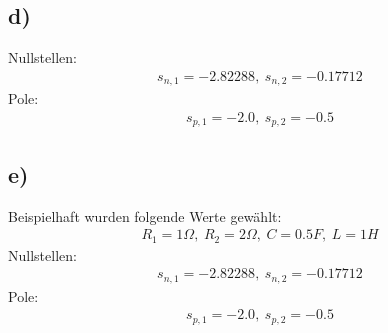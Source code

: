 \documentclass[11pt]{scrartcl} %
\begin{document}
\subsection*{d)}
Nullstellen:
\begin{align*}
	s_{n,1}=-2.82288,\hspace{3pt}s_{n,2}=-0.17712
\end{align*}
Pole:
\begin{align*}
	s_{p,1}=-2.0,\hspace{3pt}s_{p,2}=-0.5
\end{align*}
\subsection*{e)}
Beispielhaft wurden folgende Werte gewählt:
\begin{align*}
	R_1=1\Omega,\hspace{3pt}R_2=2\Omega,\hspace{3pt}C=0.5F,\hspace{3pt}L=1H
\end{align*}
Nullstellen:
\begin{align*}
	s_{n,1}=-2.82288,\hspace{3pt}s_{n,2}=-0.17712
\end{align*}
Pole:
\begin{align*}
	s_{p,1}=-2.0,\hspace{3pt}s_{p,2}=-0.5
\end{align*}
\end{document}
